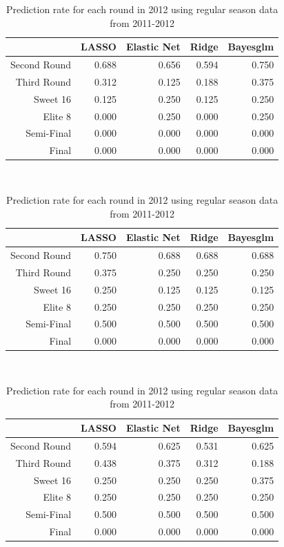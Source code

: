 \documentclass{article} %
\begin{document}
\begin{table}[H]
\centering
{\small
\begin{tabular}{rrrrr}
  \hline
 & LASSO & Elastic Net & Ridge & Bayesglm \\ 
  \hline
Second Round & 0.688 & 0.656 & 0.594 & 0.750 \\ 
  Third Round & 0.312 & 0.125 & 0.188 & 0.375 \\ 
  Sweet 16 & 0.125 & 0.250 & 0.125 & 0.250 \\ 
  Elite 8 & 0.000 & 0.250 & 0.000 & 0.250 \\ 
  Semi-Final & 0.000 & 0.000 & 0.000 & 0.000 \\ 
  Final & 0.000 & 0.000 & 0.000 & 0.000 \\ 
   \hline
\end{tabular}
}
\caption{Prediction rate for each round in 2014 using regular season data from 2013-2014}\ 

\centering
{\small
\begin{tabular}{rrrrr}
  \hline
 & LASSO & Elastic Net & Ridge & Bayesglm \\ 
  \hline
Second Round & 0.750 & 0.688 & 0.688 & 0.688 \\ 
  Third Round & 0.375 & 0.250 & 0.250 & 0.250 \\ 
  Sweet 16 & 0.250 & 0.125 & 0.125 & 0.125 \\ 
  Elite 8 & 0.250 & 0.250 & 0.250 & 0.250 \\ 
  Semi-Final & 0.500 & 0.500 & 0.500 & 0.500 \\ 
  Final & 0.000 & 0.000 & 0.000 & 0.000 \\ 
   \hline
\end{tabular}
}
\caption{Prediction rate for each round in 2013 using regular season data from 2012-2013}\ 

\centering
{\small
\begin{tabular}{rrrrr}
  \hline
 & LASSO & Elastic Net & Ridge & Bayesglm \\ 
  \hline
Second Round & 0.594 & 0.625 & 0.531 & 0.625 \\ 
  Third Round & 0.438 & 0.375 & 0.312 & 0.188 \\ 
  Sweet 16 & 0.250 & 0.250 & 0.250 & 0.375 \\ 
  Elite 8 & 0.250 & 0.250 & 0.250 & 0.250 \\ 
  Semi-Final & 0.500 & 0.500 & 0.500 & 0.500 \\ 
  Final & 0.000 & 0.000 & 0.000 & 0.000 \\ 
   \hline
\end{tabular}
}
\caption{Prediction rate for each round in 2012 using regular season data from 2011-2012}\ 

\end{table}
\end{document}
